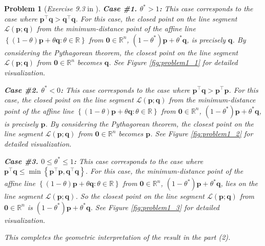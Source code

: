 \documentclass[11pt]{article}
\newtheorem{problem}{Problem}
\numberwithin{equation}{problem}
\begin{document}
\begin{problem} [\emph{Exercise 9.3} in \cite{calafiore2014optimization}]
{\indent \textbf{Case \#1. $\theta^* > 1$:} This case corresponds to the case where $\mathbf{p}^{\top} \mathbf{q} > \mathbf{q}^{\top} \mathbf{q}$. For this case, the closed point on the line segment $\mathcal{L} \left( \mathbf{p}; \mathbf{q} \right)$ from the minimum-distance point of the affine line $\left\{ \left( 1 - \theta \right) \mathbf{p} + \theta \mathbf{q} : \theta \in \mathbb{R} \right\}$ from $\mathbf{0} \in \mathbb{R}^n$, $\left( 1 - \theta^* \right) \mathbf{p} + \theta^* \mathbf{q}$, is precisely $\mathbf{q}$. By considering the Pythagorean theorem, the closest point on the line segment $\mathcal{L} \left( \mathbf{p}; \mathbf{q} \right)$ from $\mathbf{0} \in \mathbb{R}^n$ becomes $\mathbf{q}$. See Figure \ref{fig:problem1_1} for detailed visualization.
\medskip

\indent \textbf{Case \#2. $\theta^* < 0$:} This case corresponds to the case where $\mathbf{p}^{\top} \mathbf{q} > \mathbf{p}^{\top} \mathbf{p}$. For this case, the closed point on the line segment $\mathcal{L} \left( \mathbf{p}; \mathbf{q} \right)$ from the minimum-distance point of the affine line $\left\{ \left( 1 - \theta \right) \mathbf{p} + \theta \mathbf{q} : \theta \in \mathbb{R} \right\}$ from $\mathbf{0} \in \mathbb{R}^n$, $\left( 1 - \theta^* \right) \mathbf{p} + \theta^* \mathbf{q}$, is precisely $\mathbf{p}$. By considering the Pythagorean theorem, the closest point on the line segment $\mathcal{L} \left( \mathbf{p}; \mathbf{q} \right)$ from $\mathbf{0} \in \mathbb{R}^n$ becomes $\mathbf{p}$. See Figure \ref{fig:problem1_2} for detailed visualization.
\medskip

\indent \textbf{Case \#3. $0 \leq \theta^* \leq 1$:} This case corresponds to the case where $\mathbf{p}^{\top} \mathbf{q} \leq \min \left\{ \mathbf{p}^{\top} \mathbf{p}, \mathbf{q}^{\top} \mathbf{q} \right\}$. For this case, the minimum-distance point of the affine line $\left\{ \left( 1 - \theta \right) \mathbf{p} + \theta \mathbf{q} : \theta \in \mathbb{R} \right\}$ from $\mathbf{0} \in \mathbb{R}^n$, $\left( 1 - \theta^* \right) \mathbf{p} + \theta^* \mathbf{q}$, lies on the line segment $\mathcal{L} \left( \mathbf{p}; \mathbf{q} \right)$. So the closest point on the line segment $\mathcal{L} \left( \mathbf{p}; \mathbf{q} \right)$ from $\mathbf{0} \in \mathbb{R}^n$ is $\left( 1 - \theta^* \right) \mathbf{p} + \theta^* \mathbf{q}$. See Figure \ref{fig:problem1_3} for detailed visualization.
\medskip

\indent This completes the geometric interpretation of the result in the part (2).

}
\end{problem}
\end{document}
